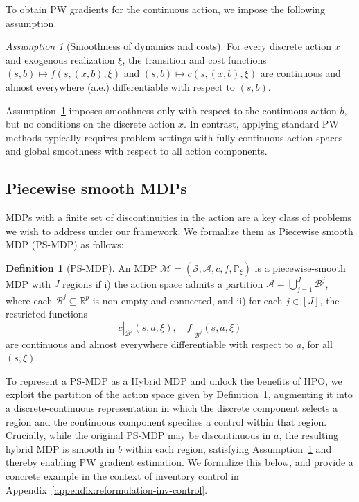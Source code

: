 \documentclass{article}
\theoremstyle{definition}
\newtheorem{definition}{Definition}
\theoremstyle{remark}
\newtheorem{assumption}{Assumption}
\begin{document}
To obtain PW gradients for the continuous action, we impose the following assumption.

\begin{assumption}[Smoothness of dynamics and costs]
\label{assumption:smoothness-for-continuous}
For every discrete action $x$ and exogenous realization $\xi$, the transition and cost functions $(s,b)\mapsto f(s,(x,b),\xi)$ and $(s,b)\mapsto c(s,(x,b),\xi)$ are continuous and almost everywhere (a.e.) differentiable with respect to $(s,b)$.
\end{assumption}

Assumption~\ref{assumption:smoothness-for-continuous} imposes smoothness only with respect to the continuous action $b$, but no conditions on the discrete action $x$. In contrast, applying standard PW methods typically requires problem settings with fully continuous action spaces and global smoothness with respect to all action components.

\subsection{Piecewise smooth MDPs}
\label{appendix:ps-mdps}

MDPs with a finite set of discontinuities in the action are a key class of problems we wish to address under our framework.
We formalize them as Piecewise smooth MDP (PS-MDP) as follows:

\begin{definition}[PS-MDP]
\label{def:ps-mdp}
An MDP $\mathcal{M} = (\mathcal{S}, \mathcal{A}, c, f, \mathbb{P}_{\xi})$ is a piecewise-smooth MDP with $J$ regions if 
i) the action space admits a partition $\mathcal{A} = \bigcup_{j=1}^J \mathcal{B}^j$, where each $\mathcal{B}^j \subseteq \mathbb{R}^p$ is non-empty and connected, and 
ii) for each $j \in [J]$, the restricted functions
\[
c|_{\mathcal{B}^j}(s,a,\xi), \quad f|_{\mathcal{B}^j}(s,a,\xi)
\]
are continuous and almost everywhere differentiable with respect to $a$, for all $(s,\xi)$.
\end{definition}

To represent a PS-MDP as a Hybrid MDP and unlock the benefits of HPO, we exploit 
the partition of the action space given by Definition~\ref{def:ps-mdp}, augmenting 
it into a discrete-continuous representation in which the discrete component selects 
a region and the continuous component specifies a control within that region. 
Crucially, while the original PS-MDP may be discontinuous in $a$, the resulting 
hybrid MDP is smooth in $b$ within each region, satisfying 
Assumption~\ref{assumption:smoothness-for-continuous} and thereby enabling PW 
gradient estimation. We formalize this below, and provide a concrete example in the 
context of inventory control in Appendix~\ref{appendix:reformulation-inv-control}.
\end{document}
